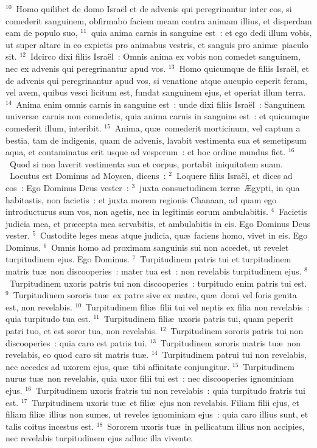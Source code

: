${}^{10}$~Homo quilibet de domo Isra\"el et de advenis qui peregrinantur inter eos, si comederit sanguinem, obfirmabo faciem meam contra animam illius, et disperdam eam de populo suo,
${}^{11}$~quia anima carnis in sanguine est~: et ego dedi illum vobis, ut super altare in eo expietis pro animabus vestris, et sanguis pro anim\ae\ piaculo sit.
${}^{12}$~Idcirco dixi filiis Isra\"el~: Omnis anima ex vobis non comedet sanguinem, nec ex advenis qui peregrinantur apud vos.
${}^{13}$~Homo quicumque de filiis Isra\"el, et de advenis qui peregrinantur apud vos, si venatione atque aucupio ceperit feram, vel avem, quibus vesci licitum est, fundat sanguinem ejus, et operiat illum terra.
${}^{14}$~Anima enim omnis carnis in sanguine est~: unde dixi filiis Isra\"el~: Sanguinem univers\ae\ carnis non comedetis, quia anima carnis in sanguine est~: et quicumque comederit illum, interibit.
${}^{15}$~Anima, qu\ae\ comederit morticinum, vel captum a bestia, tam de indigenis, quam de advenis, lavabit vestimenta sua et semetipsum aqua, et contaminatus erit usque ad vesperum~: et hoc ordine mundus fiet.
${}^{16}$~Quod si non laverit vestimenta sua et corpus, portabit iniquitatem suam.
~Locutus est Dominus ad Moysen, dicens~:
${}^{2}$~Loquere filiis Isra\"el, et dices ad eos~: Ego Dominus Deus vester~:
${}^{3}$~juxta consuetudinem terr\ae\ \AE gypti, in qua habitastis, non facietis~: et juxta morem regionis Chanaan, ad quam ego introducturus sum vos, non agetis, nec in legitimis eorum ambulabitis.
${}^{4}$~Facietis judicia mea, et pr\ae cepta mea servabitis, et ambulabitis in eis. Ego Dominus Deus vester.
${}^{5}$~Custodite leges meas atque judicia, qu\ae\ faciens homo, vivet in eis. Ego Dominus.
${}^{6}$~Omnis homo ad proximam sanguinis sui non accedet, ut revelet turpitudinem ejus. Ego Dominus.
${}^{7}$~Turpitudinem patris tui et turpitudinem matris tu\ae\ non discooperies~: mater tua est~: non revelabis turpitudinem ejus.
${}^{8}$~Turpitudinem uxoris patris tui non discooperies~: turpitudo enim patris tui est.
${}^{9}$~Turpitudinem sororis tu\ae\ ex patre sive ex matre, qu\ae\ domi vel foris genita est, non revelabis.
${}^{10}$~Turpitudinem fili\ae\ filii tui vel neptis ex filia non revelabis~: quia turpitudo tua est.
${}^{11}$~Turpitudinem fili\ae\ uxoris patris tui, quam peperit patri tuo, et est soror tua, non revelabis.
${}^{12}$~Turpitudinem sororis patris tui non discooperies~: quia caro est patris tui.
${}^{13}$~Turpitudinem sororis matris tu\ae\ non revelabis, eo quod caro sit matris tu\ae .
${}^{14}$~Turpitudinem patrui tui non revelabis, nec accedes ad uxorem ejus, qu\ae\ tibi affinitate conjungitur.
${}^{15}$~Turpitudinem nurus tu\ae\ non revelabis, quia uxor filii tui est~: nec discooperies ignominiam ejus.
${}^{16}$~Turpitudinem uxoris fratris tui non revelabis~: quia turpitudo fratris tui est.
${}^{17}$~Turpitudinem uxoris tu\ae\ et fili\ae\ ejus non revelabis. Filiam filii ejus, et filiam fili\ae\ illius non sumes, ut reveles ignominiam ejus~: quia caro illius sunt, et talis coitus incestus est.
${}^{18}$~Sororem uxoris tu\ae\ in pellicatum illius non accipies, nec revelabis turpitudinem ejus adhuc illa vivente.


